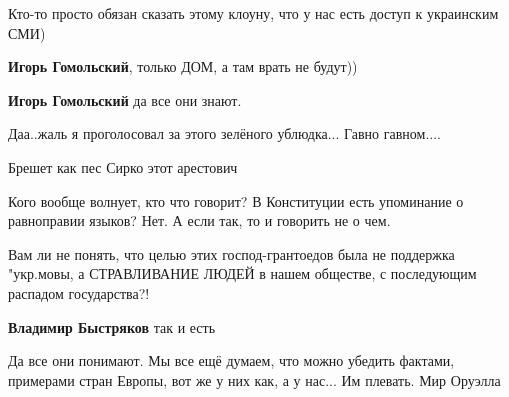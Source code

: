 \begin{itemize}
Кто-то просто обязан сказать этому клоуну, что у нас есть доступ к украинским СМИ)

\begin{itemize} %
\textbf{Игорь Гомольский}, только ДОМ, а там врать не будут))

\textbf{Игорь Гомольский} да все они знают.
\end{itemize} %

Даа..жаль я проголосовал за этого зелёного ублюдка... Гавно гавном....

Брешет как пес Сирко этот арестович

Кого вообще волнует, кто что говорит? В Конституции есть упоминание о равноправии языков? Нет. А если так, то и говорить не о чем.


Вам ли не понять, что целью этих господ-грантоедов была не поддержка "укр.мовы,
а СТРАВЛИВАНИЕ ЛЮДЕЙ в нашем обществе, с последующим распадом государства?!

\begin{itemize} %
\textbf{Владимир Быстряков} так и есть
\end{itemize} %


Да все они понимают. Мы все ещё думаем, что можно убедить фактами, примерами
стран Европы, вот же у них как, а у нас... Им плевать. Мир Оруэлла

\end{itemize} %
